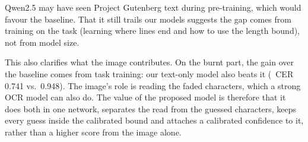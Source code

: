 Qwen2.5 may have seen Project Gutenberg text during pre-training, which would favour the
baseline. That it still trails our models suggests the gap comes from training on the task
(learning where lines end and how to use the length bound), not from model size.

This also clarifies what the image contributes. On the burnt part, the gain over the baseline
comes from task training: our text-only model also beats it (\INF\ CER 0.741 vs.\ 0.948). The
image's role is reading the faded characters, which a strong OCR model can also do. The value of
the proposed model is therefore that it does both in one network, separates the read from the
guessed characters, keeps every guess inside the calibrated bound and attaches a calibrated
confidence to it, rather than a higher score from the image alone.
